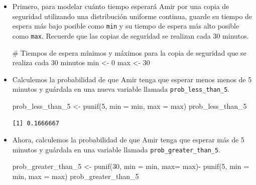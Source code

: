 \documentclass[
  letterpaper,
  DIV=11,
  numbers=noendperiod]{scrreprt}
\newenvironment{Shaded}{\begin{snugshade}}{\end{snugshade}}
\newcommand{\AttributeTok}[1]{\textcolor[rgb]{0.40,0.45,0.13}{#1}}
\newcommand{\CommentTok}[1]{\textcolor[rgb]{0.37,0.37,0.37}{#1}}
\newcommand{\DecValTok}[1]{\textcolor[rgb]{0.68,0.00,0.00}{#1}}
\newcommand{\FunctionTok}[1]{\textcolor[rgb]{0.28,0.35,0.67}{#1}}
\newcommand{\NormalTok}[1]{\textcolor[rgb]{0.00,0.23,0.31}{#1}}
\newcommand{\OtherTok}[1]{\textcolor[rgb]{0.00,0.23,0.31}{#1}}
\newcommand{\SpecialCharTok}[1]{\textcolor[rgb]{0.37,0.37,0.37}{#1}}
\begin{document}
\begin{itemize}
\item
  Primero, para modelar cuánto tiempo esperará Amir por una copia de
  seguridad utilizando una distribución uniforme continua, guarde su
  tiempo de espera más bajo posible como \texttt{min} y su tiempo de
  espera más alto posible como \texttt{max}. Recuerde que las copias de
  seguridad se realizan cada 30 minutos.

\begin{Shaded}
\begin{Highlighting}[]
\CommentTok{\# Tiempos de espera mínimos y máximos para la copia de seguridad que se realiza cada 30 minutos}
\NormalTok{min }\OtherTok{\textless{}{-}} \DecValTok{0}
\NormalTok{max }\OtherTok{\textless{}{-}} \DecValTok{30}
\end{Highlighting}
\end{Shaded}
\item
  Calculemos la probabilidad de que Amir tenga que esperar menos menos
  de 5 minutos y guárdala en una nueva variable llamada
  \texttt{prob\_less\_than\_5}.

\begin{Shaded}
\begin{Highlighting}[]
\NormalTok{prob\_less\_than\_5 }\OtherTok{\textless{}{-}} \FunctionTok{punif}\NormalTok{(}\DecValTok{5}\NormalTok{, }\AttributeTok{min =}\NormalTok{ min, }\AttributeTok{max =}\NormalTok{ max)}
\NormalTok{prob\_less\_than\_5}
\end{Highlighting}
\end{Shaded}

\begin{verbatim}
[1] 0.1666667
\end{verbatim}
\item
  Ahora, calculemos la probabilidad de que Amir tenga que esperar más de
  5 minutos y guárdala en una variable llamada
  \texttt{prob\_greater\_than\_5}.

\begin{Shaded}
\begin{Highlighting}[]
\NormalTok{prob\_greater\_than\_5 }\OtherTok{\textless{}{-}} \FunctionTok{punif}\NormalTok{(}\DecValTok{30}\NormalTok{, }\AttributeTok{min =}\NormalTok{ min, }\AttributeTok{max=}\NormalTok{ max)}\SpecialCharTok{{-}} \FunctionTok{punif}\NormalTok{(}\DecValTok{5}\NormalTok{, }\AttributeTok{min =}\NormalTok{ min, }\AttributeTok{max =}\NormalTok{ max)}
\NormalTok{prob\_greater\_than\_5}
\end{Highlighting}
\end{Shaded}


\end{itemize}
\end{document}
